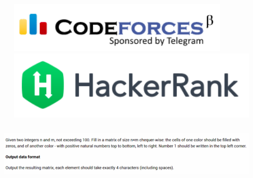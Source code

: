 \documentclass[10pt]{beamer}
\begin{document}
\begin{frame}
\begin{columns}
\begin{column}{0.5\textwidth}
\begin{columns}
\begin{column}{0.35\textwidth}
\begin{center}
                \end{center}
            \end{column}
            \begin{column}{0.65\textwidth}
                \begin{center}
                    \includegraphics[width=\textwidth]{images/codeforces.png} \\
                    \includegraphics[width=\textwidth]{images/hackerank.png}
                \end{center}
            \end{column}
        \end{columns}
    \end{column}
\end{columns}

\vskip3mm

\includegraphics[width=\textwidth]{images/stepik_example.png}

\end{frame}
\end{document}
